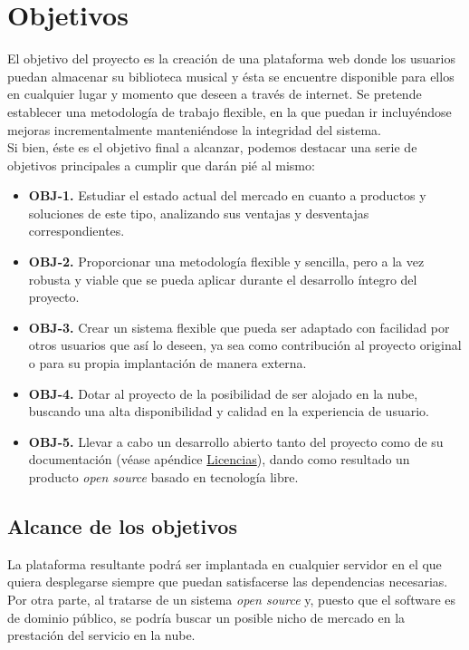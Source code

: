 \chapter{Objetivos}
\label{cap:objetivos}

El objetivo del proyecto es la creación de una plataforma web donde los usuarios puedan almacenar su biblioteca musical y ésta se encuentre disponible para ellos en cualquier lugar y momento que deseen a través de internet. Se pretende establecer una metodología de trabajo flexible, en la que puedan ir incluyéndose mejoras incrementalmente manteniéndose la integridad del sistema. \\

Si bien, éste es el objetivo final a alcanzar, podemos destacar una serie de objetivos principales a cumplir que darán pié al mismo:

\begin{itemize}
	\item \textbf{OBJ-1.} Estudiar el estado actual del mercado en cuanto a productos y soluciones de este tipo, analizando sus ventajas y desventajas correspondientes.

	\item \textbf{OBJ-2.} Proporcionar una metodología flexible y sencilla, pero a la vez robusta y viable que se pueda aplicar durante el desarrollo íntegro del proyecto. 

	\item \textbf{OBJ-3.} Crear un sistema flexible que pueda ser adaptado con facilidad por otros usuarios que así lo deseen, ya sea como contribución al proyecto original o para su propia implantación de manera externa.

	\item \textbf{OBJ-4.} Dotar al proyecto de la posibilidad de ser alojado en la nube, buscando una alta disponibilidad y calidad en la experiencia de usuario.

	\item \textbf{OBJ-5.} Llevar a cabo un desarrollo abierto tanto del proyecto como de su documentación (véase apéndice \hyperref[sec:licencias]{Licencias}), dando como resultado un producto \textit{open source} basado en tecnología libre.
\end{itemize}

\bigskip

\section{Alcance de los objetivos}

La plataforma resultante podrá ser implantada en cualquier servidor en el que quiera desplegarse siempre que puedan satisfacerse las dependencias necesarias. Por otra parte, al tratarse de un sistema \textit{open source} y, puesto que el software es de dominio público, se podría buscar un posible nicho de mercado en la prestación del servicio en la nube.
